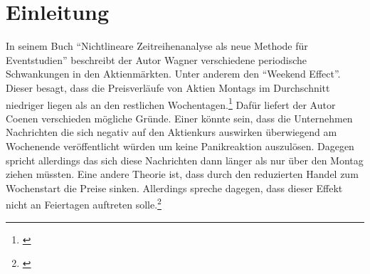 \section{Einleitung}


In seinem Buch \enquote{Nichtlineare Zeitreihenanalyse als neue Methode für Eventstudien} beschreibt der Autor Wagner verschiedene periodische Schwankungen in den Aktienmärkten. Unter anderem den \enquote{Weekend Effect}. Dieser besagt, dass die Preisverläufe von Aktien Montags im Durchschnitt niedriger liegen als an den restlichen Wochentagen.\footnote{\cite[Vgl.][17]{Wagner2019}} Dafür liefert der Autor Coenen verschieden mögliche Gründe. Einer könnte sein, dass die Unternehmen Nachrichten die sich negativ auf den Aktienkurs auswirken überwiegend am Wochenende veröffentlicht würden um keine Panikreaktion auszulösen. Dagegen spricht allerdings das sich diese Nachrichten dann länger als nur über den Montag ziehen müssten. Eine andere Theorie ist, dass durch den reduzierten Handel zum Wochenstart die Preise sinken. Allerdings spreche dagegen, dass dieser Effekt nicht an Feiertagen auftreten solle.\footnote{\cite[Vgl.][8]{Coenen2020}}

\clearpage